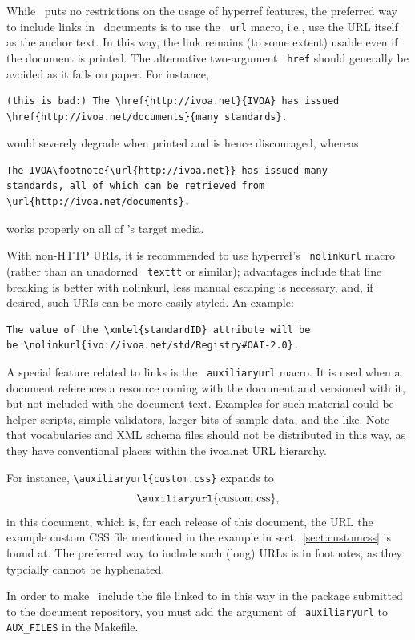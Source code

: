 \documentclass[11pt,a4paper]{ivoa}
\newcommand{\texword}[1]{\texttt{\color{texcolor} #1}}
\begin{document}
While \ivoatex\ puts no restrictions on the usage of hyperref features,
the preferred way to include links in \ivoatex\ documents is to use the
\texword{url} macro, i.e., use the URL itself as the anchor text.  In
this way, the link remains (to some extent) usable even if the document
is printed.  The alternative two-argument \texword{href} should
generally be avoided as it fails on paper.  For instance,
\begin{lstlisting}
(this is bad:) The \href{http://ivoa.net}{IVOA} has issued
\href{http://ivoa.net/documents}{many standards}.
\end{lstlisting}
would severely degrade when printed and is hence discouraged, whereas
\begin{lstlisting}
The IVOA\footnote{\url{http://ivoa.net}} has issued many 
standards, all of which can be retrieved from 
\url{http://ivoa.net/documents}.
\end{lstlisting}
works properly on all of \ivoatex's target media.

With non-HTTP URIs, it is recommended to use hyperref's
\texword{nolinkurl} macro (rather than an unadorned \texword{texttt} or
similar); advantages include that line breaking is better with
nolinkurl, less manual escaping is necessary, and, if desired, 
such URIs can be more easily styled.  An example:

\begin{lstlisting}
The value of the \xmlel{standardID} attribute will be
be \nolinkurl{ivo://ivoa.net/std/Registry#OAI-2.0}.
\end{lstlisting}

A special feature related to links is the \texword{auxiliaryurl} macro.
It is used when a document references a resource coming with the
document and versioned with it, but not included with the document text.
Examples for such material could be helper scripts, simple validators,
larger bits of sample data, and the like.  Note that vocabularies and
XML schema files should not be distributed in this way, as they have
conventional places within the ivoa.net URL hierarchy.

For instance, \verb|\auxiliaryurl{custom.css}| expands to
$$\hbox{\auxiliaryurl{custom.css},}$$ in this document, 
which is, for each release of this
document, the URL the example custom CSS file mentioned in the example
in sect.~\ref{sect:customcss} is found at.  The preferred way to include
such (long) URLs is in footnotes, as they typcially cannot be hyphenated.

In order to make \ivoatex~include the file linked to in this way in the
package submitted to the document repository, you must add the argument
of \texword{auxiliaryurl} to \verb|AUX_FILES| in the Makefile.
\end{document}
